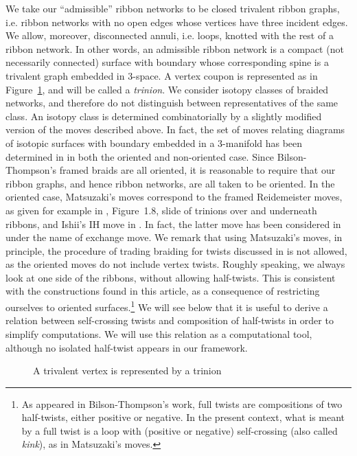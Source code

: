\documentclass[aps,nofootinbib,amsfonts,superscriptaddress]{revtex4}
\begin{document}
 We take our ``admissible'' ribbon networks to be closed trivalent ribbon graphs, i.e. ribbon networks with no open edges whose vertices have three incident edges. We allow, moreover, disconnected annuli, i.e. loops, knotted with the rest of a ribbon network. In other words, an admissible ribbon network is a compact (not necessarily connected) surface with boundary whose corresponding spine is a trivalent graph embedded in $3$-space. A vertex coupon is represented as in Figure~\ref{fig:trinion}, and will be called a {\it trinion}. We consider isotopy classes of braided networks, and therefore do not distinguish between representatives of the same class. An isotopy class is determined combinatorially by a slightly modified version of the moves described above. In fact, the set of moves relating diagrams of isotopic surfaces with boundary embedded in a $3$-manifold has been determined in \cite{Matsuzaki} in both the oriented and non-oriented case. Since Bilson-Thompson's framed braids are all oriented, it is reasonable to require that our ribbon graphs, and hence ribbon networks, are all taken to be oriented. In the oriented case, Matsuzaki's moves \cite{Matsuzaki} correspond to the framed Reidemeister moves, as given for example in \cite{Ohtsuki}, Figure~1.8, slide of trinions over and underneath ribbons, and Ishii's IH move in \cite{Ishii}. In fact, the latter move has been considered in \cite{BT2} under the name of exchange move. We remark that using Matsuzaki's moves, in principle, the procedure of trading braiding for twists discussed in \cite{BT2009} is not allowed, as the oriented moves do not include vertex twists. Roughly speaking, we always look at one side of the ribbons, without allowing half-twists. This is consistent with the constructions found in this article, as a consequence of restricting ourselves to oriented surfaces.\footnote{As appeared in Bilson-Thompson's work, full twists are compositions of two half-twists, either positive or negative. In the present context, what is meant by a full twist is a loop with (positive or negative) self-crossing (also called {\it kink}), as in Matsuzaki's moves.} We will see below that it is useful to derive a relation between self-crossing twists and composition of half-twists in order to simplify computations. We will use this relation as a computational tool, although no isolated half-twist appears in our framework. \\

\begin{figure}
    \centering
    \caption{A trivalent vertex is represented by a trinion}
    \label{fig:trinion}
\end{figure}
	
\end{document}
